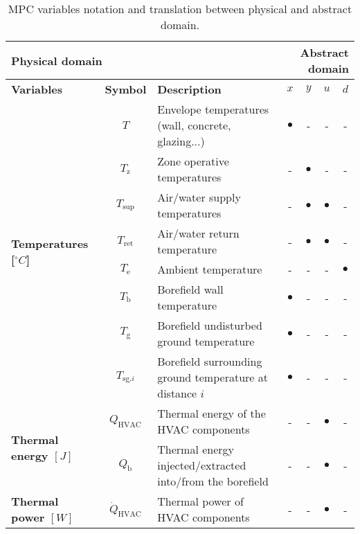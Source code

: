\documentclass[10pt]{extarticle}
\begin{document}
\begin{table}[ht]
	\centering
	\caption{MPC variables notation and translation between physical and abstract domain.}
	\label{tab:mpc_form:translation}
	\begin{adjustwidth}{-1cm}{}
	\begin{tabular}{l|c|l|cccc}
		\toprule
		\multicolumn{3}{l}{\textbf{Physical domain}} &  \multicolumn{4}{r}{\textbf{Abstract domain}} \\
		\toprule
		\textbf{Variables} & \textbf{Symbol} & \textbf{Description} & \textbf{$x$} & \textbf{$y$} & \textbf{$u$} & \textbf{$d$}  \\ 
		\midrule
		\multirow{8}{*}{\textbf{Temperatures [$^\circ C$]}} & $T$ & Envelope temperatures (wall, concrete, glazing...) & $\bullet$ & -  & - & - \\ 
		& $T_{\text{z}}$ & Zone operative temperatures  & - & $\bullet$ & -  & - \\
		& $T_{\text{sup}}$ & Air/water supply temperatures &  - & $\bullet$ & $\bullet$ & -  \\
		& $T_{\text{ret}}$ & Air/water return temperature &  - & $\bullet$ & $\bullet$ & - \\
		& $T_\text{e}$ & Ambient temperature &  - & - & - & $\bullet$ \\
		& $T_\text{b}$ & Borefield wall temperature & $\bullet$ & - & - & - \\
			& $T_\text{g}$ & Borefield undisturbed ground temperature & $\bullet$ & - & - & - \\
			& $T_{\text{sg,}i}$ & Borefield surrounding ground temperature at distance $i$ & $\bullet$ & - & - & - \\
		\midrule
		\multirow{2}{*}{\textbf{Thermal energy $[J]$}} 
		& $Q_{\text{HVAC}}$ & Thermal energy of the HVAC components  & - & - &  $\bullet$ & - \\
		& $Q_{\text{b}}$ & Thermal energy injected/extracted into/from the borefield & - & - & $\bullet$ & -  \\
		\midrule
		\multirow{5}{*}{\textbf{Thermal power $[W]$}} 
		& $\dot{Q}_{\text{HVAC}}$ & Thermal power of  HVAC components  & - & - &  $\bullet$ &- \\

\end{tabular}
\end{adjustwidth}
\end{table}
\end{document}
